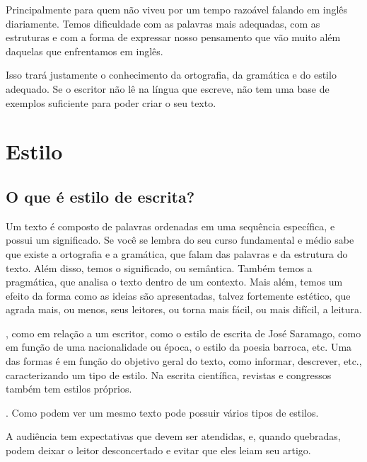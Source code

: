 \documentclass[openany]{book}
\begin{document}
 Principalmente para quem não viveu por um tempo razoável falando em inglês diariamente. Temos dificuldade com as palavras mais adequadas, com as estruturas e com a forma de expressar nosso pensamento que vão muito além daquelas que enfrentamos em inglês.

 Isso trará justamente o conhecimento da ortografia, da gramática e do estilo adequado. Se o escritor não lê na língua que escreve, não tem uma base de exemplos suficiente para poder criar o seu texto.


\chapter{Estilo}

\section{O que é estilo de escrita?}

 Um texto é composto de palavras ordenadas em uma sequência específica, e possui um significado. Se você se lembra do seu curso fundamental e médio sabe que existe a ortografia e a gramática, que falam das palavras e da estrutura do texto. Além disso, temos o significado, ou semântica. Também temos a pragmática, que analisa o texto dentro de um contexto. Mais além, temos um efeito da forma como as ideias são apresentadas, talvez fortemente estético, que agrada mais, ou menos, seus leitores, ou torna mais fácil, ou mais difícil, a leitura.

, como em relação a um escritor, como o estilo de escrita de José Saramago, como em função de uma nacionalidade ou época, o estilo da poesia barroca, etc. Uma das formas é em função do objetivo geral do texto, como informar, descrever, etc., caracterizando um tipo de estilo. Na escrita científica, revistas e congressos também tem estilos próprios.

\citep{jeffrey:2016}.
Como podem ver um mesmo texto pode possuir vários tipos de estilos.

 A audiência tem expectativas que devem ser atendidas, e, quando quebradas, podem deixar o leitor desconcertado e evitar que eles leiam seu artigo.
\end{document}
